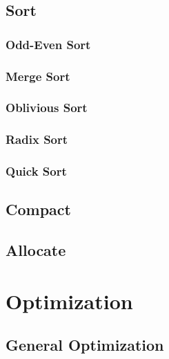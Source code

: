 \documentclass[12px,oz]{report}
\theoremstyle{indented}
\theoremstyle{indented}
\begin{document}
	\section{Sort}
	\label{sec:al_sort}
	
	
		\subsection{Odd-Even Sort}
		\label{sec:al_sort_odd}
		
		
		\subsection{Merge Sort}
		\label{sec:al_sort_merge}
		
		
		\subsection{Oblivious Sort}
		\label{sec:al_sort_obli}
		
	
		\subsection{Radix Sort}
		\label{sec:al_sort_radix}
		

		\subsection{Quick Sort}
		\label{sec:al_sor_quick}
		

	\section{Compact}
	\label{sec-compact}
	
	
	\section{Allocate}
	\label{sec-allocate}
	
	
\chapter{Optimization}
\label{ch-opti-intro}


\section{General Optimization}
\label{sec-general-opti}

\end{document}
